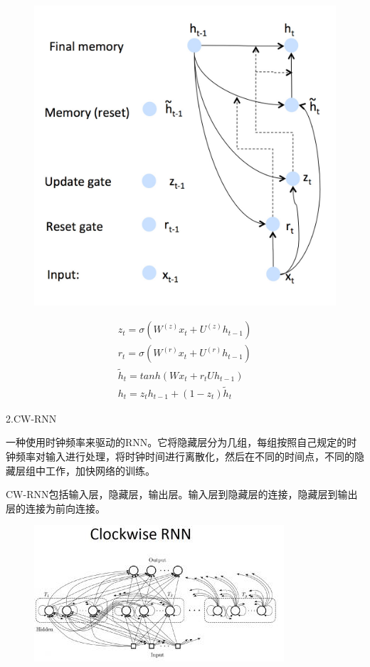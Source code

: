 \documentclass[openbib]{article}
\begin{document}
\begin{figure}[htbp]
	\centering
	\includegraphics[scale=0.2]{GRU结构图}
\end{figure}
\begin{align*}
	z_t=\sigma(W^{(z)}x_t+U^{(z)}h_{t-1})	\\
	r_t=\sigma(W^{(r)}x_t+U^{(r)}h_{t-1})	\\
	\widetilde{h}_t = tanh(Wx_t + r_tUh_{t-1}) 	\\
	h_t=z_th_{t-1}+(1-z_t)\widetilde{h}_t
\end{align*}

\begin{center}
	2.CW-RNN
\end{center} 

一种使用时钟频率来驱动的RNN。它将隐藏层分为几组，每组按照自己规定的时钟频率对输入进行处理，将时钟时间进行离散化，然后在不同的时间点，不同的隐藏层组中工作，加快网络的训练。

CW-RNN包括输入层，隐藏层，输出层。输入层到隐藏层的连接，隐藏层到输出层的连接为前向连接。

\begin{figure}[htbp]
	\centering
	\includegraphics[scale=0.7]{CW-RNN结构图}
\end{figure}
\end{document}
